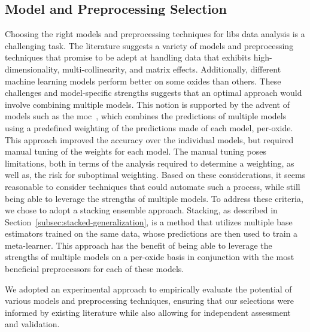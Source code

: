 \subsection{Model and Preprocessing Selection}
Choosing the right models and preprocessing techniques for \gls{libs} data analysis is a challenging task. 
The literature suggests a variety of models and preprocessing techniques that promise to be adept at handling data that exhibits high-dimensionality, multi-collinearity, and matrix effects.
Additionally, different machine learning models perform better on some oxides than others. 
These challenges and model-specific strengths suggests that an optimal approach would involve combining multiple models. 
This notion is supported by the advent of models such as the \gls{moc}~\cite{cleggRecalibrationMarsScience2017}, which combines the predictions of multiple models using a predefined weighting of the predictions made of each model, per-oxide.
This approach improved the accuracy over the individual models, but required manual tuning of the weights for each model.
The manual tuning poses limitations, both in terms of the analysis required to determine a weighting, as well as, the risk for suboptimal weighting.
Based on these considerations, it seems reasonable to consider techniques that could automate such a process, while still being able to leverage the strengths of multiple models.
To address these criteria, we chose to adopt a stacking ensemble approach. 
Stacking, as described in Section~\ref{subsec:stacked-generalization}, is a method that utilizes multiple base estimators trained on the same data, whose predictions are then used to train a meta-learner.
This approach has the benefit of being able to leverage the strengths of multiple models on a per-oxide basis in conjunction with the most beneficial preprocessors for each of these models.

We adopted an experimental approach to empirically evaluate the potential of various models and preprocessing techniques, ensuring that our selections were informed by existing literature while also allowing for independent assessment and validation.

